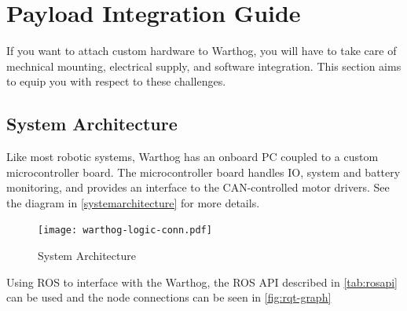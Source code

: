 \documentclass[]{clearpath-latex/clearpath-manual}
\begin{document}
\section{Payload Integration Guide}

If you want to attach custom hardware to Warthog, you will have to take care of mechnical mounting, electrical supply, and software integration.  This section aims to equip you with respect to these challenges.

\subsection{System Architecture}

Like most robotic systems, Warthog has an onboard PC coupled to a custom microcontroller board. The microcontroller board handles IO, system and battery monitoring, and provides an interface to the CAN-controlled motor drivers. See the diagram in \autoref{systemarchitecture} for more details.

\begin{figure}[!htb]
  \centering
  \texttt{[image: warthog-logic-conn.pdf]}
  \caption{System Architecture}
  \label{systemarchitecture}
\end{figure}

Using ROS to interface with the Warthog, the ROS API described in \autoref{tab:rosapi} can be used and the node connections can be seen in \autoref{fig:rqt-graph}
\end{document}
